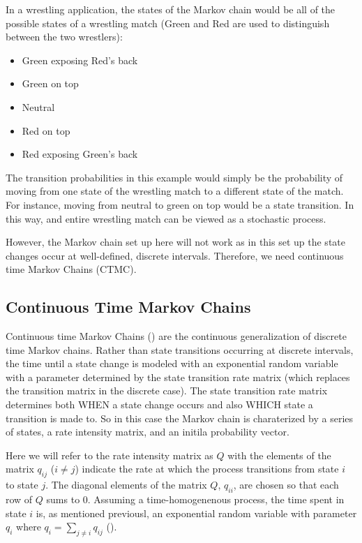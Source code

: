 \documentclass{article}\usepackage[]{graphicx}\usepackage[]{color}
\begin{document}
In a wrestling application, the states of the Markov chain would be all of the possible states of a wrestling match (Green and Red are used to distinguish between the two wrestlers): 
\begin{itemize}
\item Green exposing Red's back
\item Green on top
\item Neutral
\item Red on top
\item Red exposing Green's back
\end{itemize}

The transition probabilities in this example would simply be the probability of moving from one state of the wrestling match to a different state of the match. For instance, moving from neutral to green on top would be a state transition.  In this way, and entire wrestling match can be viewed as a stochastic process.  

However, the Markov chain set up here will not work as in this set up the state changes occur at well-defined, discrete intervals.  Therefore, we need continuous time Markov Chains (CTMC).   

\subsection{Continuous Time Markov Chains}
Continuous time Markov Chains (\cite{Andserson1991}) are the continuous generalization of discrete time Markov chains.  Rather than state transitions occurring at discrete intervals, the time until a state change is modeled with an exponential random variable with a parameter determined by the state transition rate matrix (which replaces the transition matrix in the discrete case).  The state transition rate matrix determines both WHEN a state change occurs and also WHICH state a transition is made to.  So in this case the Markov chain is charaterized by a series of states, a rate intensity matrix, and an initila probability vector.  

Here we will refer to the rate intensity matrix as $Q$ with the elements of the matrix $q_{ij}$ ($i \ne j$) indicate the rate at which the process transitions from state $i$ to state $j$.  The diagonal elements of the matrix $Q$, $q_{ii}$, are chosen so that each row of $Q$ sums to 0.  Assuming a time-homogenenous process, the time spent in state $i$ is, as mentioned previousl, an exponential random variable with parameter $q_i$ where $q_i = \sum_{j \ne i}q_{ij}$ (\cite{Liu2015}).  
\end{document}
